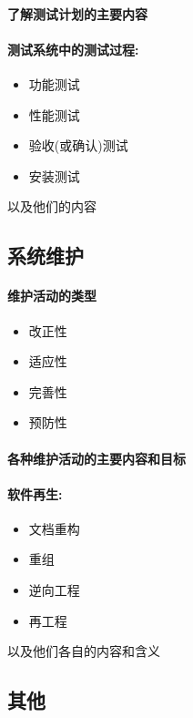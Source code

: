 \documentclass[UTF8,a4paper]{ctexart}
\begin{document}
\paragraph{了解测试计划的主要内容}

\paragraph{测试系统中的测试过程:}
\begin{itemize}
  \item 功能测试
  \item 性能测试
  \item 验收(或确认)测试
  \item 安装测试
\end{itemize}
以及他们的内容

\subsection{系统维护}
\paragraph{维护活动的类型}
\begin{itemize}
  \item 改正性
  \item 适应性
  \item 完善性
  \item 预防性
\end{itemize}

\paragraph{各种维护活动的主要内容和目标}

\paragraph{软件再生:}
\begin{itemize}
  \item 文档重构
  \item 重组
  \item 逆向工程
  \item 再工程
\end{itemize}

以及他们各自的内容和含义

\subsection{其他}
\end{document}
